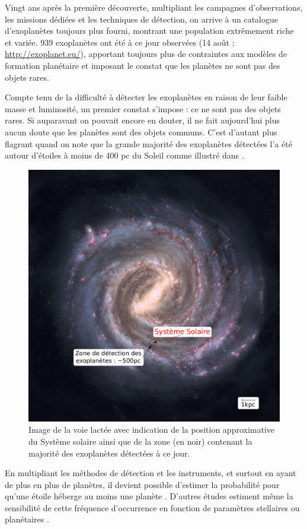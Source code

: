 Vingt ans après la première découverte, multipliant les campagnes d'observations, les missions dédiées et les techniques
de détection, on arrive à un catalogue d'exoplanètes toujours plus fourni, montrant une
population extrêmement riche et variée. 939 exoplanètes ont été à ce jour observées (14 août ; \url{http://exoplanet.eu/}),
apportant toujours plus de contraintes aux modèles de formation planétaire et imposant le constat que les planètes ne sont pas des objets rares. 

Compte tenu de la difficulté à détecter les exoplanètes en raison de leur faible masse et luminosité, un premier constat
s'impose : ce ne sont pas des objets rares. Si auparavant on pouvait encore en douter, il ne fait aujourd'hui plus aucun doute
que les planètes sont des objets communs. C'est d'autant plus flagrant quand on note que la grande majorité des exoplanètes
détectées l'a été autour d'étoiles à moins de 400 pc du Soleil comme illustré dans . 

\begin{figure}[htbp]
\centering
\includegraphics[width=0.45\linewidth]{figure/milky_way_exoplanets.pdf}
\caption[Sphère de détection des exoplanètes par rapport à la Voie Lactée]{Image de la voie lactée avec indication de la
position approximative du Système solaire ainsi que de la zone (en noir) contenant la majorité des exoplanètes détectées à ce
jour.}\label{fig:milky_way_exoplanet}
\end{figure}


En multipliant les méthodes de détection et les instruments, et surtout en ayant de plus en plus de planètes, il devient
possible d'estimer la probabilité pour qu'une étoile héberge au moins une planète \citep{mayor2011road}. D'autres études
estiment même la sensibilité de cette fréquence d'occurrence en fonction de paramètres stellaires \citep{fischer2005planet,
johnson2007new, howard2012occurrence} ou planétaires \citep{mayor2011road, howard2010occurrence}. 

